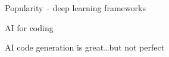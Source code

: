 \begin{frame}
    
    Popularity -- deep learning frameworks
    
    \begin{figure}
       \begin{center}
       \end{center}
    \end{figure}

\end{frame}



\begin{frame}{AI for coding}
    
    \begin{figure}
       \centering
    \end{figure}

\end{frame}

\begin{frame}
    
    AI code generation is great\ldots but not perfect

\end{frame}



